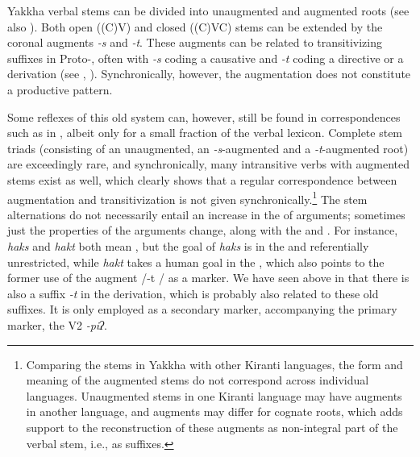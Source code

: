 Yakkha verbal stems can be divided into unaugmented and augmented roots (see also ). Both open ((C)V) and closed ((C)VC) stems can be extended by the coronal augments \emph{-s} and \emph{-t}. These augments can be related to transitivizing suffixes in Proto-, often with \emph{-s} coding a causative and \emph{-t} coding a directive or a  derivation (see \citet[457]{Matisoff2003Handbook}, \citealt[160]{Driem1989_Reflexes}). Synchronically, however, the augmentation does not constitute a productive pattern. 

Some reflexes of this old system can, however, still be found in correspondences such as in , albeit only for a small fraction of the verbal lexicon. Complete stem triads (consisting of an unaugmented, an \emph{-s}-augmented and a \emph{-t}-augmented root) are exceedingly rare, and synchronically, many intransitive verbs with augmented stems exist as well, which clearly shows that a regular correspondence between augmentation and transitivization is not given synchronically.\footnote{Comparing the stems in Yakkha with other Kiranti languages, the form and meaning of the augmented stems do not correspond across individual languages. Unaugmented stems in one Kiranti language may have augments in another language, and augments may differ for cognate roots, which adds support to the reconstruction of these augments as non-integral part of the verbal stem, i.e., as suffixes.} The stem alternations do not necessarily entail an increase in the  of arguments; sometimes just the properties of the arguments change, along with the  and . For instance, \emph{haks} and \emph{hakt} both mean , but the goal of \emph{haks} is in the   and referentially unrestricted, while \emph{hakt} takes a human goal in the , which also points to the former use of the augment /-t / as a  marker. We have seen above in  that there is also a suffix \emph{-t}  in the  derivation, which is probably also related to these old suffixes. It is only employed as a secondary marker, accompanying the primary  marker, the V2 \emph{-piʔ}. 


